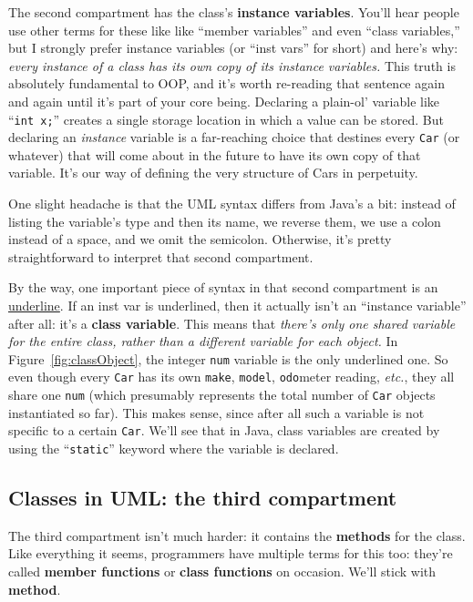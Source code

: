 The second compartment has the class's \textbf{instance variables}. You'll
hear people use other terms for these like like ``member variables'' and even
``class variables,'' but I strongly prefer instance variables (or ``inst
vars'' for short) and here's why: \textit{every instance of a class has its
own copy of its instance variables.} This truth is absolutely fundamental to
OOP, and it's worth re-reading that sentence again and again until it's part
of your core being. Declaring a plain-ol' variable like ``\texttt{int x;}''
creates a single storage location in which a value can be stored. But
declaring an \textit{instance} variable is a far-reaching choice that destines
every \texttt{Car} (or whatever) that will come about in the future to have
its own copy of that variable. It's our way of defining the very structure of
Cars in perpetuity.

One slight headache is that the UML syntax differs from Java's a bit: instead
of listing the variable's type and then its name, we reverse them, we use
a colon instead of a space, and we omit the semicolon. Otherwise, it's pretty
straightforward to interpret that second compartment.

By the way, one important piece of syntax in that second compartment is an
\underline{underline}. If an inst var is underlined, then it actually isn't an
``instance variable'' after all: it's a \textbf{class variable}. This means
that \textit{there's only one shared variable for the entire class, rather
than a different variable for each object.} In Figure~\ref{fig:classObject},
the integer \texttt{num} variable is the only underlined one. So even though
every \texttt{Car} has its own \texttt{make}, \texttt{model},
\texttt{odo}meter reading, \textit{etc.}, they all share one \texttt{num}
(which presumably represents the total number of \texttt{Car} objects
instantiated so far). This makes sense, since after all such a variable is not
specific to a certain \texttt{Car}. We'll see that in Java, class variables
are created by using the ``\texttt{static}'' keyword where the variable is
declared.

\subsection{Classes in UML: the third compartment}

The third compartment isn't much harder: it contains the \textbf{methods} for
the class. Like everything it seems, programmers have multiple terms for this
too: they're called \textbf{member functions} or \textbf{class functions} on
occasion. We'll stick with \textbf{method}.

